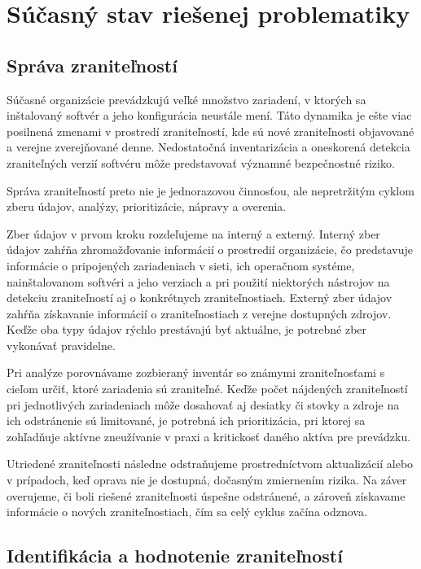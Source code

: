\chapter{Súčasný stav riešenej problematiky}
\label{kap:sucasnyStav}

\section{Správa zraniteľností}
\label{sec:spravaZranitelnosti}

Súčasné organizácie prevádzkujú veľké množstvo zariadení, v ktorých sa inštalovaný softvér a jeho konfigurácia neustále mení.
Táto dynamika je ešte viac posilnená zmenami v prostredí zraniteľností, kde sú nové zraniteľnosti objavované a verejne zverejňované denne.
Nedostatočná inventarizácia a oneskorená detekcia zraniteľných verzií softvéru môže predstavovať významné bezpečnostné riziko.

Správa zraniteľností preto nie je jednorazovou činnosťou, ale nepretržitým cyklom zberu údajov, analýzy, prioritizácie, nápravy a overenia.

Zber údajov v prvom kroku rozdeľujeme na interný a externý. Interný zber údajov zahŕňa zhromažďovanie informácií o prostredií organizácie,
čo predstavuje informácie o pripojených zariadeniach v sieti, ich operačnom systéme, nainštalovanom softvéri 
a jeho verziach a pri použití niektorých nástrojov na detekciu zraniteľností aj o konkrétnych zraniteľnostiach.
Externý zber údajov zahŕňa získavanie informácií o zraniteľnostiach z verejne dostupných zdrojov.
Keďže oba typy údajov rýchlo prestávajú byť aktuálne, je potrebné zber vykonávať pravidelne.

Pri analýze porovnávame zozbieraný inventár so známymi zraniteľnosťami s cieľom určiť, ktoré zariadenia sú zraniteľné. 
Keďže počet nájdených zraniteľností pri jednotlivých zariadeniach môže dosahovať aj desiatky či stovky a zdroje na ich
odstránenie sú limitované, je potrebná ich prioritizácia, pri ktorej sa zohľadňuje aktívne zneužívanie v praxi a kritickosť daného aktíva pre prevádzku.

Utriedené zraniteľnosti následne odstraňujeme prostredníctvom aktualizácií alebo v prípadoch, keď oprava nie je dostupná,
dočasným zmiernením rizika. 
Na záver overujeme, či boli riešené zraniteľnosti úspešne odstránené, a zároveň získavame informácie o nových zraniteľnostiach,
čím sa celý cyklus začína odznova.

\section{Identifikácia a hodnotenie zraniteľností}
\label{sec:identifikaciaHodnotenie}


